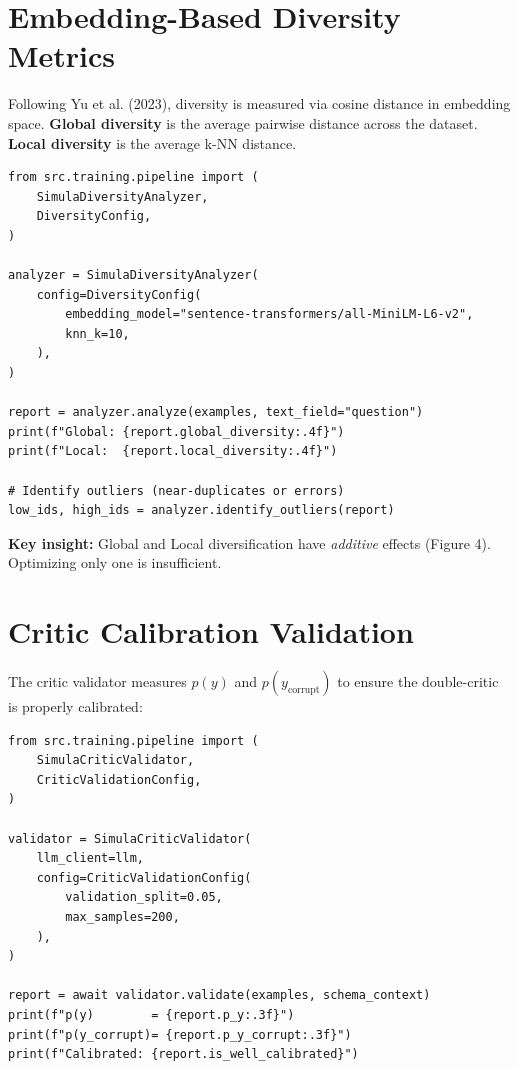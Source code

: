 \section{Embedding-Based Diversity Metrics}

Following Yu et al. (2023), diversity is measured via cosine distance in embedding
space. \textbf{Global diversity} is the average pairwise distance across the dataset.
\textbf{Local diversity} is the average k-NN distance.

\begin{lstlisting}[language=jsonx,caption={Diversity analyzer usage}]
from src.training.pipeline import (
    SimulaDiversityAnalyzer,
    DiversityConfig,
)

analyzer = SimulaDiversityAnalyzer(
    config=DiversityConfig(
        embedding_model="sentence-transformers/all-MiniLM-L6-v2",
        knn_k=10,
    ),
)

report = analyzer.analyze(examples, text_field="question")
print(f"Global: {report.global_diversity:.4f}")
print(f"Local:  {report.local_diversity:.4f}")

# Identify outliers (near-duplicates or errors)
low_ids, high_ids = analyzer.identify_outliers(report)
\end{lstlisting}

\textbf{Key insight:} Global and Local diversification have \emph{additive} effects
(Figure 4). Optimizing only one is insufficient.

\section{Critic Calibration Validation}

The critic validator measures $p(y)$ and $p(y_{\text{corrupt}})$ to ensure the
double-critic is properly calibrated:

\begin{lstlisting}[language=jsonx,caption={Critic validator usage}]
from src.training.pipeline import (
    SimulaCriticValidator,
    CriticValidationConfig,
)

validator = SimulaCriticValidator(
    llm_client=llm,
    config=CriticValidationConfig(
        validation_split=0.05,
        max_samples=200,
    ),
)

report = await validator.validate(examples, schema_context)
print(f"p(y)        = {report.p_y:.3f}")
print(f"p(y_corrupt)= {report.p_y_corrupt:.3f}")
print(f"Calibrated: {report.is_well_calibrated}")
\end{lstlisting}

